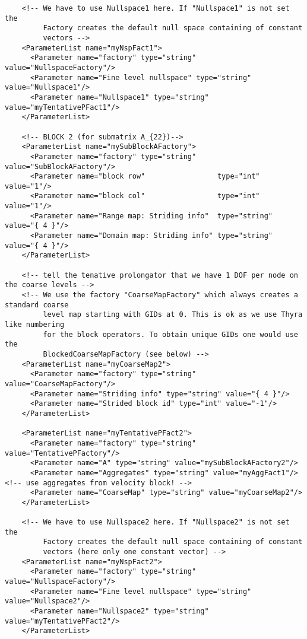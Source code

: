 \documentclass[10pt,fleqn]{book}
\begin{document}
\begin{lstlisting}
    <!-- We have to use Nullspace1 here. If "Nullspace1" is not set the 
         Factory creates the default null space containing of constant 
         vectors -->
    <ParameterList name="myNspFact1">
      <Parameter name="factory" type="string" value="NullspaceFactory"/>
      <Parameter name="Fine level nullspace" type="string" value="Nullspace1"/>
      <Parameter name="Nullspace1" type="string" value="myTentativePFact1"/>
    </ParameterList>
    
    <!-- BLOCK 2 (for submatrix A_{22})-->
    <ParameterList name="mySubBlockAFactory">
      <Parameter name="factory" type="string" value="SubBlockAFactory"/>
      <Parameter name="block row"                 type="int"     value="1"/>
      <Parameter name="block col"                 type="int"     value="1"/>
      <Parameter name="Range map: Striding info"  type="string"  value="{ 4 }"/>
      <Parameter name="Domain map: Striding info" type="string"  value="{ 4 }"/>
    </ParameterList>

    <!-- tell the tenative prolongator that we have 1 DOF per node on the coarse levels -->
    <!-- We use the factory "CoarseMapFactory" which always creates a standard coarse
         level map starting with GIDs at 0. This is ok as we use Thyra like numbering
         for the block operators. To obtain unique GIDs one would use the
         BlockedCoarseMapFactory (see below) -->
    <ParameterList name="myCoarseMap2">
      <Parameter name="factory" type="string" value="CoarseMapFactory"/>
      <Parameter name="Striding info" type="string" value="{ 4 }"/>
      <Parameter name="Strided block id" type="int" value="-1"/>
    </ParameterList>

    <ParameterList name="myTentativePFact2">
      <Parameter name="factory" type="string" value="TentativePFactory"/>
      <Parameter name="A" type="string" value="mySubBlockAFactory2"/>
      <Parameter name="Aggregates" type="string" value="myAggFact1"/> <!-- use aggregates from velocity block! -->
      <Parameter name="CoarseMap" type="string" value="myCoarseMap2"/>
    </ParameterList>

    <!-- We have to use Nullspace2 here. If "Nullspace2" is not set the 
         Factory creates the default null space containing of constant 
         vectors (here only one constant vector) -->
    <ParameterList name="myNspFact2">
      <Parameter name="factory" type="string" value="NullspaceFactory"/>
      <Parameter name="Fine level nullspace" type="string" value="Nullspace2"/>
      <Parameter name="Nullspace2" type="string" value="myTentativePFact2"/>
    </ParameterList>


\end{lstlisting}
\end{document}
